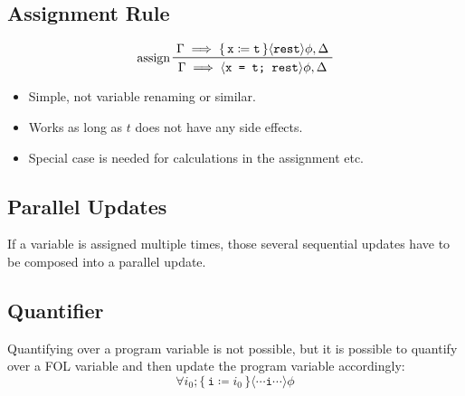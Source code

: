 	\subsection{Assignment Rule}
		\begin{equation*}
			\prftree[l]
			{assign}
			{\Gamma \implies \{\, \texttt{x} \coloneqq \texttt{t} \,\} \langle \texttt{rest} \rangle \phi, \Delta}
			{\Gamma \implies \langle \texttt{x = t; rest} \rangle \phi, \Delta}
		\end{equation*}

		\begin{itemize}
			\item Simple, not variable renaming or similar.
			\item Works as long as \(t\) does not have any side effects.
			\item Special case is needed for calculations in the assignment etc.
		\end{itemize}

	\subsection{Parallel Updates}
		If a variable is assigned multiple times, those several sequential updates have to be composed into a parallel update.



	\subsection{Quantifier}
		Quantifying over a program variable is not possible, but it is possible to quantify over a FOL variable and then update the program variable accordingly:
		\begin{equation*}
			\forall i_0; \{\, \texttt{i} \coloneqq i_0 \,\} \langle \cdots \texttt{i} \cdots \rangle \phi
		\end{equation*}

